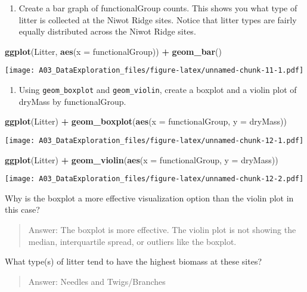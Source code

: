 \documentclass[]{article}
\newenvironment{Shaded}{\begin{snugshade}}{\end{snugshade}}
\newcommand{\DataTypeTok}[1]{\textcolor[rgb]{0.13,0.29,0.53}{#1}}
\newcommand{\KeywordTok}[1]{\textcolor[rgb]{0.13,0.29,0.53}{\textbf{#1}}}
\newcommand{\NormalTok}[1]{#1}
\newcommand{\OperatorTok}[1]{\textcolor[rgb]{0.81,0.36,0.00}{\textbf{#1}}}
\newcommand{\StringTok}[1]{\textcolor[rgb]{0.31,0.60,0.02}{#1}}
\providecommand{\tightlist}{%
  \setlength{\itemsep}{0pt}\setlength{\parskip}{0pt}}
\begin{document}
\begin{enumerate}
\def\labelenumi{\arabic{enumi}.}
\setcounter{enumi}{13}
\tightlist
\item
  Create a bar graph of functionalGroup counts. This shows you what type
  of litter is collected at the Niwot Ridge sites. Notice that litter
  types are fairly equally distributed across the Niwot Ridge sites.
\end{enumerate}

\begin{Shaded}
\begin{Highlighting}[]
\KeywordTok{ggplot}\NormalTok{(Litter, }\KeywordTok{aes}\NormalTok{(}\DataTypeTok{x =}\NormalTok{ functionalGroup)) }\OperatorTok{+}\StringTok{ }\KeywordTok{geom_bar}\NormalTok{()}
\end{Highlighting}
\end{Shaded}

\texttt{[image: A03\_DataExploration\_files/figure-latex/unnamed-chunk-11-1.pdf]}

\begin{enumerate}
\def\labelenumi{\arabic{enumi}.}
\setcounter{enumi}{14}
\tightlist
\item
  Using \texttt{geom\_boxplot} and \texttt{geom\_violin}, create a
  boxplot and a violin plot of dryMass by functionalGroup.
\end{enumerate}

\begin{Shaded}
\begin{Highlighting}[]
\KeywordTok{ggplot}\NormalTok{(Litter) }\OperatorTok{+}
\StringTok{  }\KeywordTok{geom_boxplot}\NormalTok{(}\KeywordTok{aes}\NormalTok{(}\DataTypeTok{x =}\NormalTok{ functionalGroup, }\DataTypeTok{y =}\NormalTok{ dryMass))}
\end{Highlighting}
\end{Shaded}

\texttt{[image: A03\_DataExploration\_files/figure-latex/unnamed-chunk-12-1.pdf]}

\begin{Shaded}
\begin{Highlighting}[]
\KeywordTok{ggplot}\NormalTok{(Litter) }\OperatorTok{+}
\StringTok{  }\KeywordTok{geom_violin}\NormalTok{(}\KeywordTok{aes}\NormalTok{(}\DataTypeTok{x =}\NormalTok{ functionalGroup, }\DataTypeTok{y =}\NormalTok{ dryMass))}
\end{Highlighting}
\end{Shaded}

\texttt{[image: A03\_DataExploration\_files/figure-latex/unnamed-chunk-12-2.pdf]}

Why is the boxplot a more effective visualization option than the violin
plot in this case?

\begin{quote}
Answer: The boxplot is more effective. The violin plot is not showing
the median, interquartile spread, or outliers like the boxplot.
\end{quote}

What type(s) of litter tend to have the highest biomass at these sites?

\begin{quote}
Answer: Needles and Twigs/Branches
\end{quote}
\end{document}
